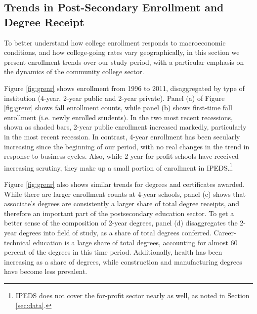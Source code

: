 \subsection{Trends in Post-Secondary Enrollment and Degree Receipt }

To better understand how college enrollment responds to macroeconomic conditions, and how college-going rates vary geographically, in this section we present enrollment trends over our study period, with a particular emphasis on the dynamics of the community college sector.



Figure \ref{fig:grenr} shows enrollment from 1996 to 2011, disaggregated by type of institution (4-year, 2-year public and 2-year private). Panel (a) of Figure \ref{fig:grenr} shows fall enrollment counts, while panel (b) shows first-time fall enrollment (i.e. newly enrolled students). In the two most recent recessions, shown as shaded bars, 2-year public enrollment increased markedly, particularly in the most recent recession. In contrast, 4-year enrollment has been secularly increasing since the beginning of our period, with no real changes in the trend in response to business cycles. Also,  while 2-year for-profit schools have received increasing scrutiny, they make up a small portion of enrollment in IPEDS.\footnote{IPEDS does not cover the for-profit sector nearly as well, as noted in Section \ref{sec:data}.}

Figure \ref{fig:grenr} also shows similar trends for degrees and certificates awarded. While there are larger enrollment counts at 4-year schools, panel (c)  shows that associate's degrees are consistently a larger share of total degree receipts, and therefore an important part of the postsecondary education sector. To get a better sense of the composition of 2-year degrees, panel (d) disaggregates the 2-year degrees into field of study, as a share of total degrees conferred. Career-technical education is a large share of total degrees, accounting for almost 60 percent of the degrees in this time period. Additionally, health has been increasing as a share of degrees, while construction and manufacturing degrees have become  less prevalent.

